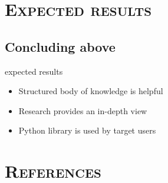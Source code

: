 \documentclass[xcolor=x11names,compress]{beamer}
\renewcommand{\(}{\begin{columns}}
\renewcommand{\)}{\end{columns}}
\newcommand{\<}[1]{\begin{column}{#1}}
\renewcommand{\>}{\end{column}}
\begin{document}
\section{\scshape Expected results}
\subsection{Concluding above}
\begin{frame}{expected results}
    \begin{itemize}
        \item Structured body of knowledge is helpful
        \item Research provides an in-depth view
        \item Python library is used by target users
    \end{itemize}
\end{frame}

\section{\scshape References}
\end{document}
